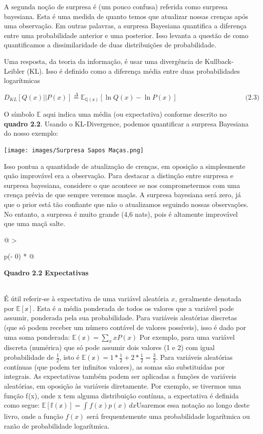\documentclass[
  12pt,
]{book}
\begin{document}
A segunda noção de surpresa é (um pouco confusa) referida como surpresa bayesiana. Esta é uma medida de quanto temos que atualizar nossas crenças após uma observação. Em outras palavras, a surpresa Bayesiana quantifica a diferença entre uma probabilidade anterior e uma posterior. Isso levanta a questão de como quantificamos a dissimilaridade de duas distribuições de probabilidade.

Uma resposta, da teoria da informação, é usar uma divergência de Kullback-Leibler (KL). Isso é definido como a diferença média entre duas probabilidades logarítmicas

\(D_{KL}[Q(x)||P(x)] \overset{\Delta}{=} \mathbb{E_{Q(x)}}[\ln{Q(x)} - \ln{P(x)}] \quad\quad\quad\quad\quad\quad\quad\quad\quad\quad \text{(2.3)}\)

O símbolo \(\mathbb{E}\) aqui indica uma média (ou expectativa) conforme descrito no \textbf{quadro 2.2}. Usando o KL-Divergence, podemos quantificar a surpresa Bayesiana do nosso exemplo:

\texttt{[image: images/Surpresa Sapos Maças.png]}

Isso pontua a quantidade de atualização de crenças, em oposição a simplesmente quão improvável era a observação. Para destacar a distinção entre surpresa e surpresa bayesiana, considere o que acontece se nos comprometermos com uma crença prévia de que sempre veremos maçãs. A surpresa bayesiana será zero, já que o prior está tão confiante que não o atualizamos seguindo nossas observações. No entanto, a surpresa é muito grande (4,6 nats), pois é altamente improvável que uma maçã salte.

\begin{longtable}[]{@{}
  >{\raggedright\arraybackslash}p{(\columnwidth - 0\tabcolsep) * }@{}}
\toprule
\begin{minipage}[b]{\linewidth}\raggedright
\textbf{Quadro 2.2 Expectativas}
\end{minipage} \\
\midrule
\endhead
É útil referir-se à expectativa de uma variável aleatória \(x\), geralmente denotada por \(\mathbb{E[x]}\). Esta é a média ponderada de todos os valores que a variável pode assumir, ponderada pela sua probabilidade. Para variáveis aleatórias discretas (que só podem receber um número contável de valores possíveis), isso é dado por uma soma ponderada: \(\mathbb{E(x)}=\sum_x{xP(x)}\) Por exemplo, para uma variável discreta (numérica) que só pode assumir dois valores (1 e 2) com igual probabilidade de \(\frac{1}{2}\), isto é \(\mathbb{E(x)}=1*\frac{1}{2}+2*\frac{1}{2}=\frac{3}{2}\). Para variáveis aleatórias contínuas (que podem ter infinitos valores), as somas são substituídas por integrais. As expectativas também podem ser aplicadas a funções de variáveis aleatórias, em oposição às variáveis diretamente. Por exemplo, se tivermos uma função f (x), onde x tem alguma distribuição contínua, a expectativa é definida como segue: \(\mathbb{E[f(x)]}=\int_{}^{} f(x)p(x)\, dx\)Usaremos essa notação ao longo deste livro, onde a função \(f (x)\) será frequentemente uma probabilidade logarítmica ou razão de probabilidade logarítmica. \\
 \\
\bottomrule
\end{longtable}
\end{document}
